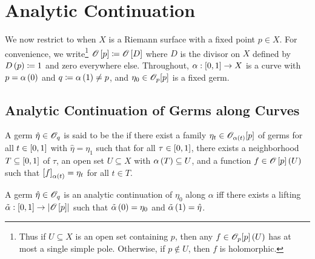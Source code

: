 \documentclass[../Moduli_Spaces_of_Riemann_Surfaces.tex]{subfiles}
\begin{document}
    \section{Analytic Continuation}
    We now restrict to when $X$ is a Riemann surface with a fixed point $p\in X$. For convenience, we write\footnote{Thus if $U\subseteq X$ is an open set containing $p$, then any $f\in\mathscr{O}_p\!\left[p\right]\left(U\right)$ has at most a single simple pole. Otherwise, if $p\not\in U$, then $f$ is holomorphic.} $\mathscr{O}\left[p\right]\coloneqq\mathscr{O}\left[D\right]$ where $D$ is the divisor on $X$ defined by $D\left(p\right)\coloneqq1$ and zero everywhere else. Throughout, $\alpha:\left[0,1\right]\to X$ is a curve with $p=\alpha\left(0\right)$ and $q\coloneqq\alpha\left(1\right)\neq p$, and $\eta_0\in\mathscr{O}_p\!\left[p\right]$ is a fixed germ.
    \subsection{Analytic Continuation of Germs along Curves}
    \begin{definition}
        A germ $\hat{\eta}\in\mathscr{O}_q$ is said to be the  if there exist a family $\eta_t\in\mathscr{O}_{\alpha\left(t\right)}\!\left[p\right]$ of germs for all $t\in\left[0,1\right]$ with $\hat{\eta}=\eta_1$ such that for all $\tau\in\left[0,1\right]$, there exists a neighborhood $T\subseteq\left[0,1\right]$ of $\tau$, an open set $U\subseteq X$ with $\alpha\left(T\right)\subseteq U$, and a function $f\in\mathscr{O}\left[p\right]\left(U\right)$ such that $\left[f\right]_{\alpha\left(t\right)}=\eta_t$ for all $t\in T$.
    \end{definition}
    \begin{proposition}\label{CS:prp:analytic_continuation_iff_lifting}
        A germ $\hat{\eta}\in\mathscr{O}_q$ is an analytic continuation of $\eta_0$ along $\alpha$ iff there exists a lifting $\tilde{\alpha}:\left[0,1\right]\to\left|\mathscr{O}\left[p\right]\right|$ such that $\tilde{\alpha}\left(0\right)=\eta_0$ and $\tilde{\alpha}\left(1\right)=\hat{\eta}$.
    \end{proposition}
\end{document}
